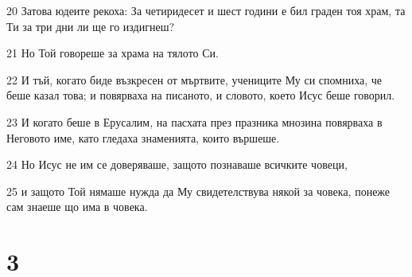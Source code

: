 \par 20 Затова юдеите рекоха: За четиридесет и шест години е бил граден тоя храм, та Ти за три дни ли ще го издигнеш?
\par 21 Но Той говореше за храма на тялото Си.
\par 22 И тъй, когато биде възкресен от мъртвите, учениците Му си спомниха, че беше казал това; и повярваха на писаното, и словото, което Исус беше говорил.
\par 23 И когато беше в Ерусалим, на пасхата през празника мнозина повярваха в Неговото име, като гледаха знаменията, които вършеше.
\par 24 Но Исус не им се доверяваше, защото познаваше всичките човеци,
\par 25 и защото Той нямаше нужда да Му свидетелствува някой за човека, понеже сам знаеше що има в човека.

\chapter{3}

